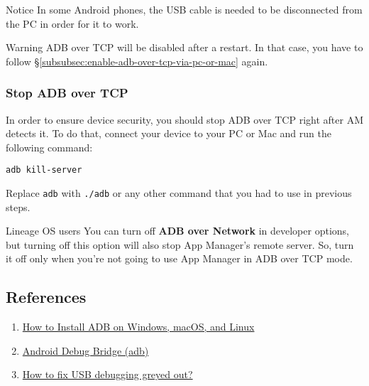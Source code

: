 \begin{tip}{Notice}
    In some Android phones, the USB cable is needed to be disconnected from the PC in order for it to work.
\end{tip}

\begin{warning}{Warning}
    ADB over TCP will be disabled after a restart. In that case, you have to follow
    §\cref{subsubsec:enable-adb-over-tcp-via-pc-or-mac} again.
\end{warning}

\subsubsection{Stop ADB over TCP}\label{subsubsec:stop-adb-over-tcp} %
In order to ensure device security, you should stop ADB over TCP right after AM detects it. To do that, connect your device to your PC or Mac and run the following command:
\begin{verbatim}
adb kill-server
\end{verbatim}
Replace \texttt{adb} with \texttt{./adb} or any other command that you had to use in previous steps.

\begin{warning}{Lineage OS users}
    You can turn off \textbf{ADB over Network} in developer options, but turning off this option will also stop App
    Manager's remote server. So, turn it off only when you're not going to use App Manager in ADB over TCP mode.
\end{warning}

\subsection{References}\label{subsec:references} %
\begin{enumerate}
    \item \href{https://www.xda-developers.com/install-adb-windows-macos-linux}{How to Install ADB on Windows, macOS, and Linux}
    \item \href{https://developer.android.com/studio/command-line/adb}{Android Debug Bridge (adb)}
    \item \href{https://www.syncios.com/android/fix-usb-debugging-grey-out.html}{How to fix USB debugging greyed out?}
\end{enumerate}
